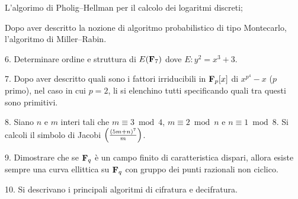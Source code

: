  L'algorimo di Pholig--Hellman per il calcolo dei logaritmi discreti; 
\vv

 Dopo aver descritto la nozione di algoritmo probabilistico di tipo Montecarlo, l'algoritmo di Miller--Rabin.  
\ve\vs

\item{6.} Determinare ordine e struttura di $E({\bf F}_7)$ dove $E: y^2=x^3+3$.\vv

\item{7.} Dopo aver descritto quali sono i fattori irriducibili in ${\bf F}_p[x]$ di $x^{p^4}-x$ ($p$ primo), nel caso in cui $p=2$, li
si elenchino tutti specificando quali tra questi sono primitivi.\vv

\item{8.} Siano $n$ e $m$ interi tali che $m\equiv3\bmod4$, $m\equiv2\bmod n$ e $n\equiv1\bmod8$. Si calcoli il simbolo di Jacobi
$\left({(5m+n)^7\over m}\right)$.\ve \vs

\item{9.} Dimostrare che se ${\bf F}_q$ \`e un campo finito di caratteristica dispari,
allora esiste sempre una curva ellittica su ${\bf F}_q$ con gruppo dei punti razionali non ciclico.
\vv\vv

\item{10.} Si descrivano i principali algoritmi di cifratura e decifratura.
\ \vst

 \bye
